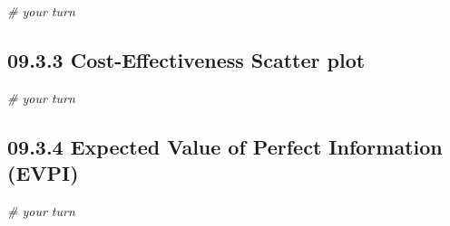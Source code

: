 \documentclass[
]{article}
\newenvironment{Shaded}{\begin{snugshade}}{\end{snugshade}}
\newcommand{\CommentTok}[1]{\textcolor[rgb]{0.56,0.35,0.01}{\textit{#1}}}
\begin{document}
\begin{Shaded}
\begin{Highlighting}[]
\CommentTok{# your turn}
\end{Highlighting}
\end{Shaded}

\hypertarget{cost-effectiveness-scatter-plot}{%
\subsection{09.3.3 Cost-Effectiveness Scatter
plot}\label{cost-effectiveness-scatter-plot}}

\begin{Shaded}
\begin{Highlighting}[]
\CommentTok{# your turn}
\end{Highlighting}
\end{Shaded}

\hypertarget{expected-value-of-perfect-information-evpi}{%
\subsection{09.3.4 Expected Value of Perfect Information
(EVPI)}\label{expected-value-of-perfect-information-evpi}}

\begin{Shaded}
\begin{Highlighting}[]
\CommentTok{# your turn}
\end{Highlighting}
\end{Shaded}
\end{document}
